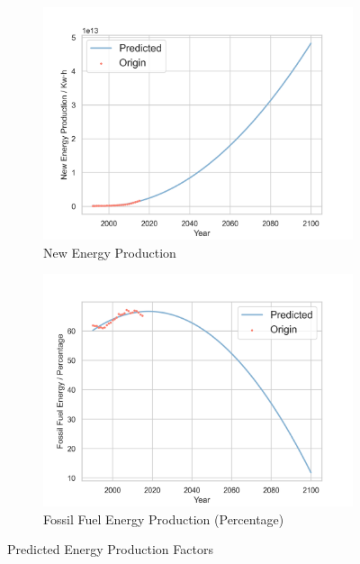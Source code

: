 \documentclass[12pt]{article}
\begin{document}
\begin{figure}[hbt]
    \centering
        \begin{subfigure}[]{0.4\textwidth}
            \includegraphics[width = \textwidth]{fig/projection/Energy_Production__New_Energy.png}
            \caption{New Energy Production}
        \end{subfigure}
        \begin{subfigure}[]{0.4\textwidth}
            \includegraphics[width = \textwidth]{fig/projection/Energy_Production__Fossil_Fuel_().png}
            \caption{Fossil Fuel Energy Production (Percentage)}
        \end{subfigure}
    \caption{Predicted Energy Production Factors}
\end{figure}
\end{document}
